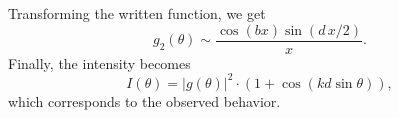 Transforming the written function, we get
\begin{equation*}
    g_2(\theta) \sim \frac{\cos (b x) \sin (d \, x /2)}{x}.
\end{equation*}
Finally, the intensity becomes
\begin{equation*}
    I(\theta) = |g(\theta)|^2 \cdot \left(
        1 + \cos(k d \sin \theta)
    \right),
\end{equation*}
which corresponds to the observed behavior.
